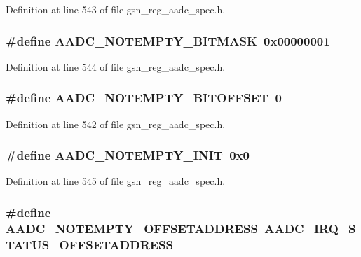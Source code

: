 Definition at line 543 of file gsn\_\-reg\_\-aadc\_\-spec.h.

\hypertarget{a00543_a6fa481be2762449640412ef6985cdaf9}{
\subsubsection[{AADC\_\-NOTEMPTY\_\-BITMASK}]{\setlength{\rightskip}{0pt plus 5cm}\#define AADC\_\-NOTEMPTY\_\-BITMASK~0x00000001}}
\label{a00543_a6fa481be2762449640412ef6985cdaf9}


Definition at line 544 of file gsn\_\-reg\_\-aadc\_\-spec.h.

\hypertarget{a00543_a25925d56223364e31c373c4880484d0c}{
\subsubsection[{AADC\_\-NOTEMPTY\_\-BITOFFSET}]{\setlength{\rightskip}{0pt plus 5cm}\#define AADC\_\-NOTEMPTY\_\-BITOFFSET~0}}
\label{a00543_a25925d56223364e31c373c4880484d0c}


Definition at line 542 of file gsn\_\-reg\_\-aadc\_\-spec.h.

\hypertarget{a00543_a275edcb1a37ca9315220c4266af71a06}{
\subsubsection[{AADC\_\-NOTEMPTY\_\-INIT}]{\setlength{\rightskip}{0pt plus 5cm}\#define AADC\_\-NOTEMPTY\_\-INIT~0x0}}
\label{a00543_a275edcb1a37ca9315220c4266af71a06}


Definition at line 545 of file gsn\_\-reg\_\-aadc\_\-spec.h.

\hypertarget{a00543_a3726fc88b3309ab10dc54e1798bc520c}{
\subsubsection[{AADC\_\-NOTEMPTY\_\-OFFSETADDRESS}]{\setlength{\rightskip}{0pt plus 5cm}\#define AADC\_\-NOTEMPTY\_\-OFFSETADDRESS~AADC\_\-IRQ\_\-STATUS\_\-OFFSETADDRESS}}
\label{a00543_a3726fc88b3309ab10dc54e1798bc520c}


